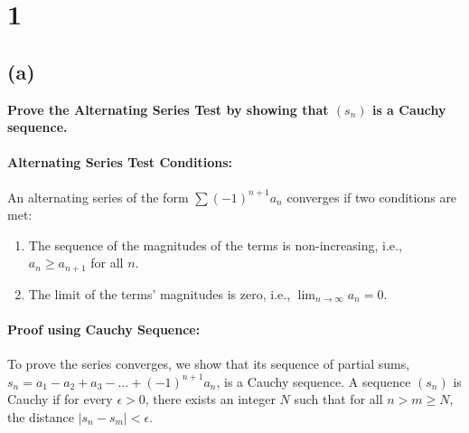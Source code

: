 \documentclass[12pt,a4paper]{article}
\theoremstyle{definition}
\theoremstyle{remark}
\begin{document}
\section*{1}

\subsection*{(a)}
\textbf{Prove the Alternating Series Test by showing that $(s_n)$ is a Cauchy sequence.}

\paragraph{Alternating Series Test Conditions:}
An alternating series of the form $\sum (-1)^{n+1}a_n$ converges if two conditions are met:
\begin{enumerate}
    \item The sequence of the magnitudes of the terms is non-increasing, i.e., $a_n \ge a_{n+1}$ for all $n$.
    \item The limit of the terms' magnitudes is zero, i.e., $\lim_{n\to\infty} a_n = 0$.
\end{enumerate}

\paragraph{Proof using Cauchy Sequence:}
To prove the series converges, we show that its sequence of partial sums, $s_n = a_1 - a_2 + a_3 - \dots + (-1)^{n+1}a_n$, is a Cauchy sequence. A sequence $(s_n)$ is Cauchy if for every $\epsilon > 0$, there exists an integer $N$ such that for all $n > m \ge N$, the distance $|s_n - s_m| < \epsilon$.
\end{document}
